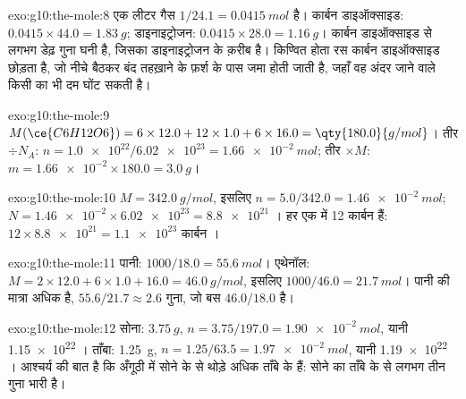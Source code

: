 \begin{solution}{exo:g10:the-mole:8}
एक लीटर गैस $1/24.1 = \qty{0.0415}{mol}$ है। कार्बन डाइऑक्साइड:
$0.0415 \times 44.0 = \qty{1.83}{g}$; डाइनाइट्रोजन:
$0.0415 \times 28.0 = \qty{1.16}{g}$। कार्बन डाइऑक्साइड  से लगभग डेढ़ गुना
घनी है, जिसका  डाइनाइट्रोजन के क़रीब है। किण्वित होता रस
कार्बन डाइऑक्साइड छोड़ता है, जो नीचे बैठकर बंद तहख़ाने के फ़र्श के पास जमा होती
जाती है, जहाँ वह अंदर जाने वाले किसी का भी दम घोंट सकती है।
\end{solution}

\begin{solution}{exo:g10:the-mole:9}
$M(\ce{C6H12O6}) = 6 \times 12.0 + 12 \times 1.0 + 6 \times 16.0 =
\qty{180.0}{g/mol}$। तीर $\div N_A$: $n = \num{1.0e22} / \num{6.02e23} =
\qty{1.66e-2}{mol}$; तीर $\times M$: $m = \num{1.66e-2} \times 180.0 =
\qty{3.0}{g}$।
\end{solution}

\begin{solution}{exo:g10:the-mole:10}
$M = \qty{342.0}{g/mol}$, इसलिए $n = 5.0 / 342.0 = \qty{1.46e-2}{mol}$;
$N = \num{1.46e-2} \times \num{6.02e23} = \num{8.8e21}$ । हर एक में
12 कार्बन  हैं: $12 \times \num{8.8e21} = \num{1.1e23}$ कार्बन ।
\end{solution}

\begin{solution}{exo:g10:the-mole:11}
पानी: $1000 / 18.0 = \qty{55.6}{mol}$। एथेनॉल:
$M = 2 \times 12.0 + 6 \times 1.0 + 16.0 = \qty{46.0}{g/mol}$, इसलिए
$1000 / 46.0 = \qty{21.7}{mol}$। पानी की मात्रा अधिक है,
$55.6 / 21.7 \approx 2.6$ गुना, जो बस $46.0 / 18.0$ है।
\end{solution}

\begin{solution}{exo:g10:the-mole:12}
सोना: $\qty{3.75}{g}$, $n = 3.75 / 197.0 = \qty{1.90e-2}{mol}$, यानी
\num{1.15e22} । ताँबा: \qty{1.25}{g},
$n = 1.25 / 63.5 = \qty{1.97e-2}{mol}$, यानी \num{1.19e22} ।
आश्चर्य की बात है कि अँगूठी में सोने के  से थोड़े अधिक ताँबे के  हैं:
सोने का  ताँबे के  से लगभग तीन गुना भारी है।
\end{solution}

